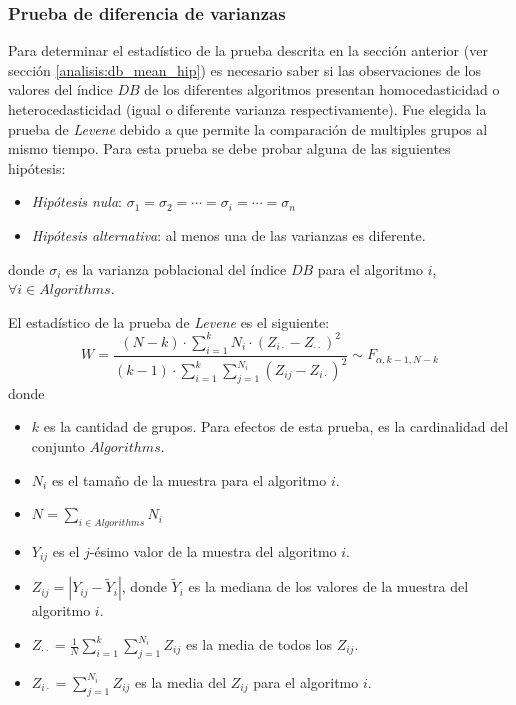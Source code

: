 \subsubsection{Prueba de diferencia de varianzas}\label{analisis:db_var_hip}

    Para determinar el estadístico de la prueba descrita en la sección
anterior (ver sección \ref{analisis:db_mean_hip}) es necesario saber si las
observaciones de los valores del índice $DB$ de los diferentes algoritmos
presentan homocedasticidad o heterocedasticidad (igual o diferente varianza
respectivamente). Fue elegida la prueba de \emph{Levene} \cite{Levene_Test}
debido a que permite la comparación de multiples grupos al mismo tiempo. Para
esta prueba se debe probar alguna de las siguientes hipótesis:
\begin{itemize}
    \item \emph{Hipótesis nula}: $\sigma_1 = \sigma_2 = \cdots = \sigma_i = \cdots = \sigma_n$
    \item \emph{Hipótesis alternativa}: al menos una de las varianzas es diferente.
\end{itemize}
donde $\sigma_i$ es la varianza poblacional del índice $DB$ para el algoritmo
$i$, $\forall i \in Algorithms$.

    El estadístico de la prueba de \emph{Levene} es el siguiente\cite{Levene_Test}:
\begin{equation}\label{levene_est}
    W = \displaystyle\frac{(N-k) \cdot \displaystyle\sum_{i = 1}^k N_i \cdot (Z_{i\cdot} - Z_{\cdot\cdot})^2}{(k - 1) \cdot \displaystyle\sum_{i = 1}^k \sum_{j = 1}^{N_i} (Z_{ij} - Z_{i\cdot})^2} \sim F_{\alpha, k - 1, N - k}
\end{equation}
donde
\begin{itemize}
    \item $k$ es la cantidad de grupos. Para efectos de esta prueba, es la
          cardinalidad del conjunto $Algorithms$.
    \item $N_i$ es el tamaño de la muestra para el algoritmo $i$.
    \item $N = \displaystyle\sum_{i \in Algorithms} N_i$
    \item $Y_{ij}$ es el $j$-ésimo valor de la muestra del algoritmo $i$.
    \item $Z_{ij} = |Y_{ij} - \tilde{Y}_i|$, donde $\tilde{Y}_i$
es la mediana de los valores de la muestra del algoritmo $i$.
    \item $Z_{\cdot\cdot} = \displaystyle\frac{1}{N} \displaystyle\sum_{i = 1}^k \sum_{j = 1}^{N_i} Z_{ij}$ es la media de todos los $Z_{ij}$.
    \item $Z_{i\cdot} = \displaystyle\sum_{j = 1}^{N_i} Z_{ij}$ es
la media del $Z_{ij}$ para el algoritmo $i$.
\end{itemize}

